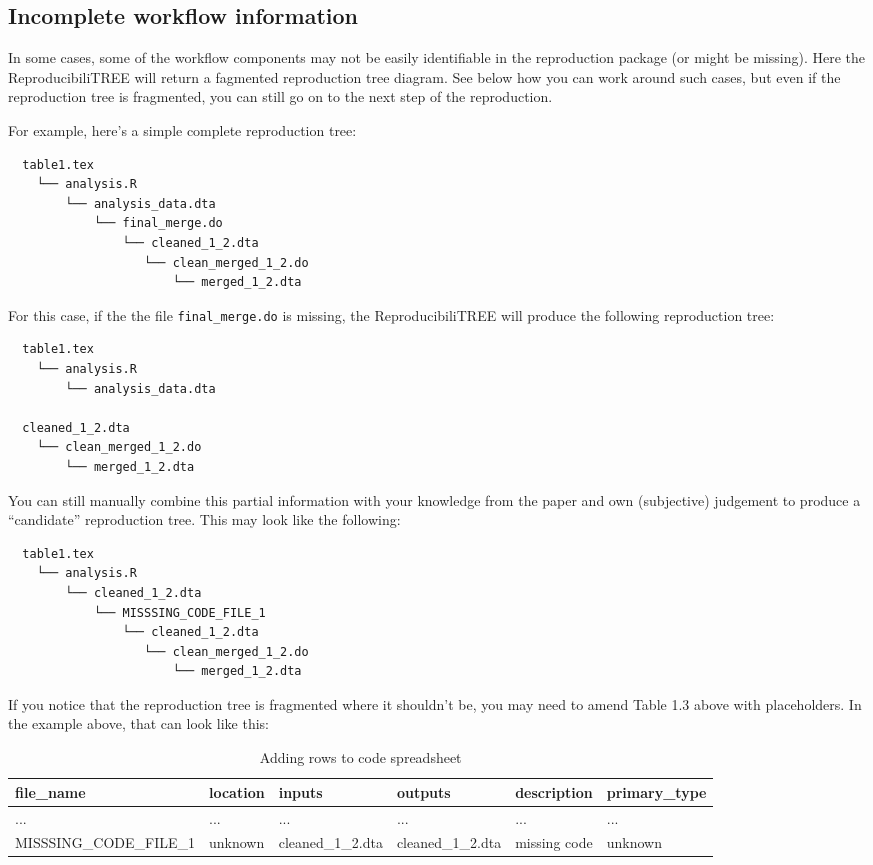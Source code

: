 \documentclass[
]{book}
\begin{document}
\hypertarget{incomplete-workflow-information}{%
\subsection{Incomplete workflow information}\label{incomplete-workflow-information}}

In some cases, some of the workflow components may not be easily identifiable in the reproduction package (or might be missing). Here the ReproducibiliTREE will return a fagmented reproduction tree diagram. See below how you can work around such cases, but even if the reproduction tree is fragmented, you can still go on to the next step of the reproduction.

For example, here's a simple complete reproduction tree:

\begin{verbatim}
  table1.tex
    └── analysis.R
        └── analysis_data.dta
            └── final_merge.do
                └── cleaned_1_2.dta
                   └── clean_merged_1_2.do
                       └── merged_1_2.dta
\end{verbatim}

For this case, if the the file \texttt{final\_merge.do} is missing, the ReproducibiliTREE will produce the following reproduction tree:

\begin{verbatim}
  table1.tex
    └── analysis.R
        └── analysis_data.dta

  cleaned_1_2.dta
    └── clean_merged_1_2.do
        └── merged_1_2.dta
\end{verbatim}

You can still manually combine this partial information with your knowledge from the paper and own (subjective) judgement to produce a ``candidate'' reproduction tree. This may look like the following:

\begin{verbatim}
  table1.tex
    └── analysis.R
        └── cleaned_1_2.dta
            └── MISSSING_CODE_FILE_1
                └── cleaned_1_2.dta
                   └── clean_merged_1_2.do
                       └── merged_1_2.dta
\end{verbatim}

If you notice that the reproduction tree is fragmented where it shouldn't be, you may need to amend Table 1.3 above with placeholders. In the example above, that can look like this:

\begin{table}

\caption{\label{tab:adding-rows}Adding rows to code spreadsheet}
\centering
\begin{tabu} to 
\hline
file\_name & location & inputs & outputs & description & primary\_type\\
\hline
... & ... & ... & ... & ... & ...\\
\hline
MISSSING\_CODE\_FILE\_1 & unknown & cleaned\_1\_2.dta & cleaned\_1\_2.dta & missing code & unknown\\
\hline
\end{tabu}
\end{table}
\end{document}
